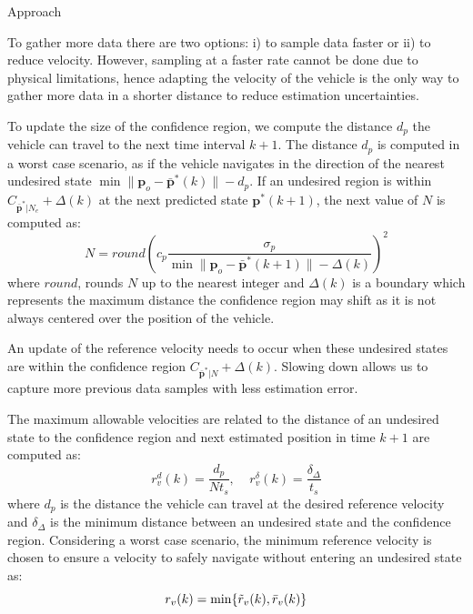\begin{section}{Approach}

To gather more data there are two options: i) to sample data faster or ii) to reduce velocity. However, sampling at a faster rate cannot be done due to physical limitations, hence adapting the velocity of the vehicle is the only way to gather more data in a shorter distance to reduce estimation uncertainties. 


To update the size of the confidence region, we compute the distance $d_p$ the vehicle can travel to the next time interval $k+1$. The distance $d_p$ is computed in a worst case scenario, as if the vehicle navigates in the direction of the nearest undesired state $\min \lVert \bm{p}_o - \bar{\bm{p}}^*(k) \rVert - d_p$. If an undesired region is within $C_{\bar{\bm{p}}^*|N_e} + \Delta(k)$ at the next predicted state $\bm{p}^*(k+1)$, the next value of $N$ is computed as:
    \begin{equation}
    \label{eq:N}
	    N = round \left(c_p \frac{ \sigma_p }{ {\min \lVert \bm{p}_o - \bar{\bm{p}}^*(k+1) \rVert} -\Delta(k) } \right)^2
	\end{equation}
where $round$, rounds $N$ up to the nearest integer and $\Delta(k)$ is a boundary which represents the maximum distance the confidence region may shift as it is not always centered over the position of the vehicle.

An update of the reference velocity needs to occur when these undesired states are within the confidence region $ C_{\bar{\bm{p}}^*|N}+\Delta(k)$. Slowing down allows us to capture more previous data samples with less estimation error. 


The maximum allowable velocities are related to the distance of an undesired state to the confidence region and next estimated position in time $k+1$ are computed as:
	\begin{equation}
	\label{eq:ref_vel_options}
	    {r}_v^d(k) = \frac{d_p}{Nt_s}, \;\;\;\; {r}_v^{\delta}(k) = \frac{\delta_{\Delta}}{t_s}
	\end{equation}
where $d_p$ is the distance the vehicle can travel at the desired reference velocity and $\delta_{\Delta}$ is the minimum distance between an undesired state and the confidence region. Considering a worst case scenario, the minimum reference velocity is chosen to ensure a velocity to safely navigate without entering an undesired state as:
    \begin{equation}
    \label{eq:ref_vel}
        r_v(k) = \min\{\Tilde{r}_v(k), \bar{r}_v(k) \}
	\end{equation}


\end{section}
